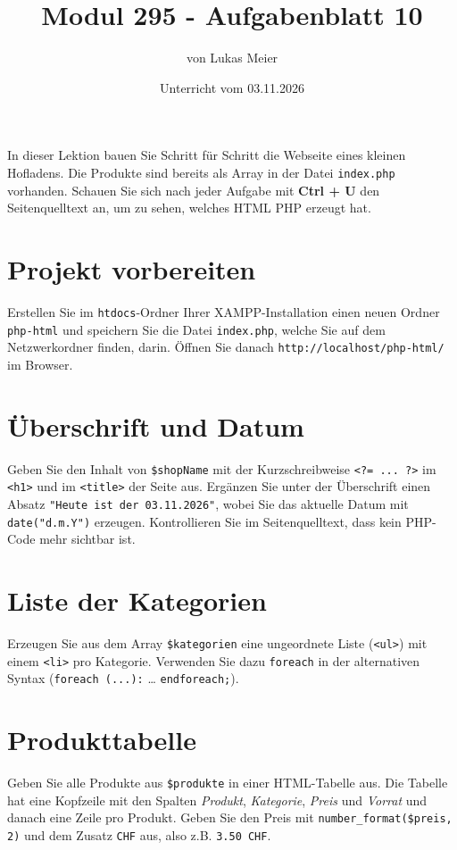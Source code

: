 \documentclass[a4paper,12pt]{article}
\title{Modul 295 - Aufgabenblatt 10}
\author{von Lukas Meier}
\date{Unterricht vom 03.11.2026}
\begin{document}
\maketitle

In dieser Lektion bauen Sie Schritt für Schritt die Webseite eines kleinen Hofladens. Die Produkte sind bereits als Array in der Datei \texttt{index.php} vorhanden. Schauen Sie sich nach jeder Aufgabe mit \textbf{Ctrl + U} den Seitenquelltext an, um zu sehen, welches HTML PHP erzeugt hat.

\section{Projekt vorbereiten}

Erstellen Sie im \texttt{htdocs}-Ordner Ihrer XAMPP-Installation einen neuen Ordner \texttt{php-html} und speichern Sie die Datei \texttt{index.php}, welche Sie auf dem Netzwerkordner finden, darin. Öffnen Sie danach \texttt{http://localhost/php-html/} im Browser.

\section{Überschrift und Datum}

Geben Sie den Inhalt von \texttt{\$shopName} mit der Kurzschreibweise \texttt{<?= ... ?>} im \texttt{<h1>} und im \texttt{<title>} der Seite aus. Ergänzen Sie unter der Überschrift einen Absatz \texttt{"{}Heute ist der 03.11.2026"{}}, wobei Sie das aktuelle Datum mit \texttt{date("{}d.m.Y"{})} erzeugen. Kontrollieren Sie im Seitenquelltext, dass kein PHP-Code mehr sichtbar ist.

\section{Liste der Kategorien}

Erzeugen Sie aus dem Array \texttt{\$kategorien} eine ungeordnete Liste (\texttt{<ul>}) mit einem \texttt{<li>} pro Kategorie. Verwenden Sie dazu \texttt{foreach} in der alternativen Syntax (\texttt{foreach (...):} \ldots{} \texttt{endforeach;}).

\section{Produkttabelle}

Geben Sie alle Produkte aus \texttt{\$produkte} in einer HTML-Tabelle aus. Die Tabelle hat eine Kopfzeile mit den Spalten \emph{Produkt}, \emph{Kategorie}, \emph{Preis} und \emph{Vorrat} und danach eine Zeile pro Produkt. Geben Sie den Preis mit \texttt{number\_format(\$preis, 2)} und dem Zusatz \texttt{CHF} aus, also z.B. \texttt{3.50 CHF}.
\end{document}

